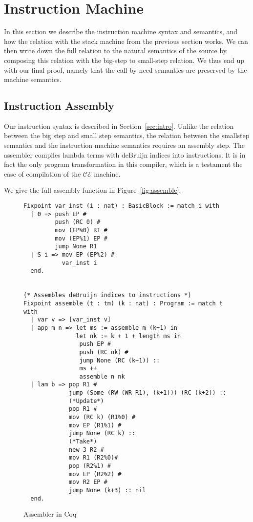 \section{Instruction Machine} \label{sec:mach}

In this section we describe the instruction machine syntax and semantics, and
how the relation with the stack machine from the previous section works. We can
then write down the full relation to the natural semantics of the source by
composing this relation with the big-step to small-step relation. We thus end
up with our final proof, namely that the call-by-need semantics are preserved
by the machine semantics. 

\subsection{Instruction Assembly}

Our instruction syntax is described in Section~\ref{sec:intro}. Unlike the
relation between the big step and small step semantics, the relation between
the smallstep semantics and the instruction machine semantics requires an 
assembly step. The assembler compiles lambda terms with deBruijn indices into
instructions. It is in fact the only program transformation in this compiler, 
which is a testament the ease of compilation of the $\mathcal{CE}$ machine.

We give the full assembly function in Figure~\ref{fig:assemble}. 

\begin{figure}
\begin{lstlisting}
Fixpoint var_inst (i : nat) : BasicBlock := match i with
  | 0 => push EP #
         push (RC 0) #
         mov (EP%0) R1 #
         mov (EP%1) EP #
         jump None R1
  | S i => mov EP (EP%2) # 
           var_inst i
  end.


(* Assembles deBruijn indices to instructions *)
Fixpoint assemble (t : tm) (k : nat) : Program := match t with  
  | var v => [var_inst v]
  | app m n => let ms := assemble m (k+1) in
               let nk := k + 1 + length ms in
                push EP #
                push (RC nk) #
                jump None (RC (k+1)) :: 
                ms ++ 
                assemble n nk
  | lam b => pop R1 #
             jump (Some (RW (WR R1), (k+1))) (RC (k+2)) ::
             (*Update*)
             pop R1 #  
             mov (RC k) (R1%0) #
             mov EP (R1%1) #
             jump None (RC k) ::
             (*Take*)
             new 3 R2 #
             mov R1 (R2%0)#
             pop (R2%1) #
             mov EP (R2%2) #
             mov R2 EP #
             jump None (k+3) :: nil
  end. 
\end{lstlisting}
\caption{Assembler in Coq}
\end{figure}

